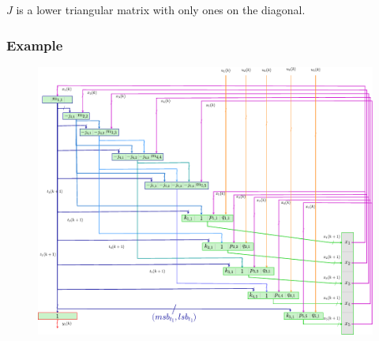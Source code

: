 \begin{frame}
	\fontsize{7}{9}\selectfont
	$J$ is a lower triangular matrix with only ones on the diagonal.
\endgroup

\end{frame}

\begin{frame}
	\frametitle{Example}
	\begin{figure}
		\includegraphics[scale=0.54]{pictures/exampleGreenScheme.pdf}
	\end{figure}
\end{frame}

